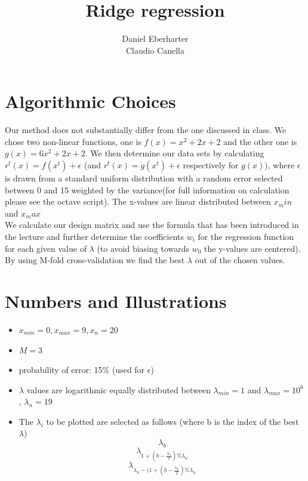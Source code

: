 \documentclass[12pt]{article}
\author{Daniel Eberharter\\ Claudio Canella}
\title{Ridge regression}
\begin{document}
\maketitle


\section{Algorithmic Choices}
Our method does not substantially differ from the one discussed in class. We chose two non-linear functions, one is $f(x) = x^2 + 2x + 2$ and the other one is $g(x) = 6x^2 + 2x + 2$. We then determine our data sets by calculating $r^t(x) = f(x^t) + \epsilon$ (and $r^t(x) = g(x^t) + \epsilon$ respectively for $g(x)$), where $\epsilon$ is drawn from a standard uniform distribution with a random error selected between 0 and 15 weighted by the variance(for full information on calculation please see the octave script). The x-values are linear distributed between $x_min$ and $x_max$ \\
We calculate our design matrix and use the formula that has been introduced in the lecture and further determine the coefficients $w_i$ for the regression function  for each given value of $\lambda$ (to avoid biasing towards $w_0$ the y-values are centered). \\
By using M-fold cross-validation we find the best $\lambda$ out of the chosen values.
\pagebreak

\section{Numbers and Illustrations}
	\begin{itemize} \label{plotted}
		\item $x_{min} = 0, x_{max} = 9, x_n = 20$
		\item $M = 3$
		\item probability of error: 15\% (used for $\epsilon$)
		\item $\lambda$ values are logarithmic equally distributed between $\lambda_{min} = 1$ and $\lambda_{max} = 10^6$, $\lambda_n = 19$
		\item The $\lambda_i$ to be plotted are selected as follows (where b is the index of the best $\lambda$)
			\[ \lambda_{b} \]
			\[ \lambda_{1+(b - \frac{\lambda_n}{2}) \% \lambda_n} \]
			\[ \lambda_{\lambda_n -( 1+(b - \frac{\lambda_n}{2}) \% \lambda_n}\]
	\end{itemize}
\end{document}
